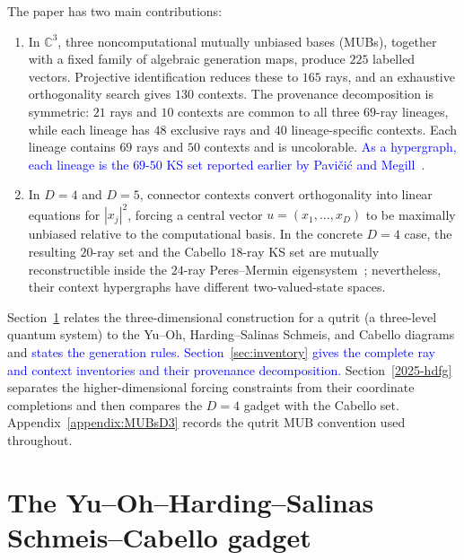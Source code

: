 \documentclass[%
  reprint,
  superscriptaddress,
  showkeys,
  amsmath,amssymb,
  aps,pra,
  longbibliography,
  floatfix,
  x11names
]{revtex4-2}
\DeclareRobustCommand{\chg}[1]{\textcolor{blue}{#1}}
\begin{document}
The paper has two main contributions:
\begin{enumerate}
\item In $\mathbb{C}^3$, three noncomputational mutually unbiased bases (MUBs), together with a fixed family of algebraic generation maps, produce $225$ labelled vectors.  Projective identification reduces these to $165$ rays, and an exhaustive orthogonality search gives $130$ contexts.  The provenance decomposition is symmetric: $21$ rays and $10$ contexts are common to all three $69$-ray lineages, while each lineage has $48$ exclusive rays and $40$ lineage-specific contexts.  Each lineage contains $69$ rays and $50$ contexts and is uncolorable.  \chg{As a hypergraph, each lineage is the $69$-$50$ KS set reported earlier by Pavi\v{c}i\'{c} and Megill~\cite{pavicic-megill-2022,Pavicic_2023}.}
\item In $D=4$ and $D=5$, connector contexts convert orthogonality into linear equations for $|x_j|^2$, forcing a central vector $u=(x_1,\ldots,x_D)$ to be maximally unbiased relative to the computational basis.  In the concrete $D=4$ case, the resulting $20$-ray set and the Cabello $18$-ray KS set are mutually reconstructible inside the $24$-ray Peres--Mermin eigensystem~\cite{peres111,mermin90b,peres-91,pavicic-2004ksafq,cabello-96}; nevertheless, their context hypergraphs have different two-valued-state spaces.
\end{enumerate}

Section~\ref{2025-yohscg} relates the
three-dimensional construction for a qutrit (a three-level quantum system)
to the Yu--Oh, Harding--Salinas Schmeis, and Cabello diagrams and \chg{states the generation rules.  Section~\ref{sec:inventory} gives the complete ray and context inventories and their provenance decomposition.}  Section~\ref{2025-hdfg} separates the higher-dimensional forcing constraints from their coordinate completions and then compares the $D=4$ gadget with the Cabello set.  Appendix~\ref{appendix:MUBsD3} records the qutrit MUB convention used throughout.


\section{The Yu--Oh--Harding--Salinas Schmeis--Cabello gadget}
\label{2025-yohscg}
\end{document}
